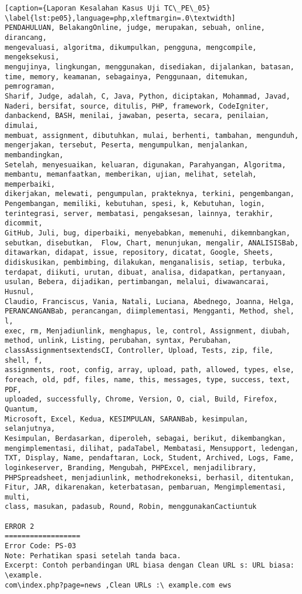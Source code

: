 \begin{enumerate}
\begin{lstlisting}[caption={Laporan Kesalahan Kasus Uji TC\_PE\_05}	\label{lst:pe05},language=php,xleftmargin=.0\textwidth]
PENDAHULUAN, BelakangOnline, judge, merupakan, sebuah, online, dirancang, 
mengevaluasi, algoritma, dikumpulkan, pengguna, mengcompile, mengeksekusi, 
mengujinya, lingkungan, menggunakan, disediakan, dijalankan, batasan, 
time, memory, keamanan, sebagainya, Penggunaan, ditemukan, pemrograman, 
Sharif, Judge, adalah, C, Java, Python, diciptakan, Mohammad, Javad, 
Naderi, bersifat, source, ditulis, PHP, framework, CodeIgniter, 
danbackend, BASH, menilai, jawaban, peserta, secara, penilaian, dimulai, 
membuat, assignment, dibutuhkan, mulai, berhenti, tambahan, mengunduh, 
mengerjakan, tersebut, Peserta, mengumpulkan, menjalankan, membandingkan, 
Setelah, menyesuaikan, keluaran, digunakan, Parahyangan, Algoritma, 
membantu, memanfaatkan, memberikan, ujian, melihat, setelah, memperbaiki, 
dikerjakan, melewati, pengumpulan, prakteknya, terkini, pengembangan, 
Pengembangan, memiliki, kebutuhan, spesi, k, Kebutuhan, login, 
terintegrasi, server, membatasi, pengaksesan, lainnya, terakhir, dicommit, 
GitHub, Juli, bug, diperbaiki, menyebabkan, memenuhi, dikemnbangkan, 
sebutkan, disebutkan,  Flow, Chart, menunjukan, mengalir, ANALISISBab, 
ditawarkan, didapat, issue, repository, dicatat, Google, Sheets,
didiskusikan, pembimbing, dilakukan, menganalisis, setiap, terbuka, 
terdapat, diikuti, urutan, dibuat, analisa, didapatkan, pertanyaan, 
usulan, Bebera, dijadikan, pertimbangan, melalui, diwawancarai, Husnul, 
Claudio, Franciscus, Vania, Natali, Luciana, Abednego, Joanna, Helga, 
PERANCANGANBab, perancangan, diimplementasi, Mengganti, Method, shel, l, 
exec, rm, Menjadiunlink, menghapus, le, control, Assignment, diubah, 
method, unlink, Listing, perubahan, syntax, Perubahan, 
classAssignmentsextendsCI, Controller, Upload, Tests, zip, file, shell, f, 
assignments, root, config, array, upload, path, allowed, types, else, 
foreach, old, pdf, files, name, this, messages, type, success, text, PDF, 
uploaded, successfully, Chrome, Version, O, cial, Build, Firefox, Quantum, 
Microsoft, Excel, Kedua, KESIMPULAN, SARANBab, kesimpulan, selanjutnya, 
Kesimpulan, Berdasarkan, diperoleh, sebagai, berikut, dikembangkan, 
mengimplementasi, dilihat, padaTabel, Membatasi, Mensupport, ledengan, 
TXT, Display, Name, pendaftaran, Lock, Student, Archived, Logs, Fame, 
loginkeserver, Branding, Mengubah, PHPExcel, menjadilibrary, 
PHPSpreadsheet, menjadiunlink, methodrekoneksi, berhasil, ditentukan, 
Fitur, JAR, dikarenakan, keterbatasan, pembaruan, Mengimplementasi, multi, 
class, masukan, padasub, Round, Robin, menggunakanCactiuntuk

ERROR 2
==================
Error Code: PS-03
Note: Perhatikan spasi setelah tanda baca.
Excerpt: Contoh perbandingan URL biasa dengan Clean URL s: URL biasa: \example.
com\index.php?page=news ,Clean URLs :\ example.com ews 


\end{lstlisting}
\end{enumerate}
